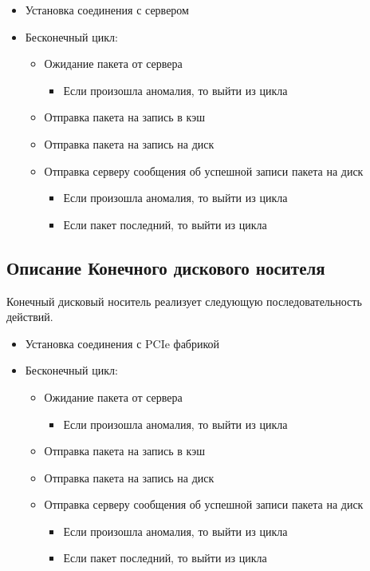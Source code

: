 \begin{itemize}
\item Установка соединения с сервером
\item Бесконечный цикл:
	\begin{itemize}
		\item Ожидание пакета от сервера
		\begin{itemize}
			\item Если произошла аномалия, то выйти из цикла
		\end{itemize}
		
		\item Отправка пакета на запись в кэш
		\item Отправка пакета на запись на диск		
		\item  Отправка серверу сообщения об успешной записи пакета на диск 
		\begin{itemize}
			\item Если произошла аномалия, то выйти из цикла
		\end{itemize}
		\begin{itemize}
			\item Если пакет последний, то выйти из цикла
		\end{itemize}
	\end{itemize}
\end{itemize}

\subsection{Описание Конечного дискового носителя}

Конечный дисковый носитель реализует следующую последовательность действий.

\begin{itemize}
\item Установка соединения с PCIe фабрикой
\item Бесконечный цикл:
	\begin{itemize}
		\item Ожидание пакета от сервера
		\begin{itemize}
			\item Если произошла аномалия, то выйти из цикла
		\end{itemize}
		
		\item Отправка пакета на запись в кэш
		\item Отправка пакета на запись на диск		
		\item  Отправка серверу сообщения об успешной записи пакета на диск 
		\begin{itemize}
			\item Если произошла аномалия, то выйти из цикла
		\end{itemize}
		\begin{itemize}
			\item Если пакет последний, то выйти из цикла
		\end{itemize}
	\end{itemize}
\end{itemize}

